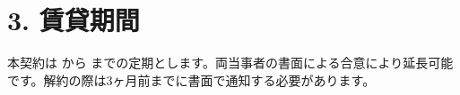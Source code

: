 \section*{3. 賃貸期間}
本契約は \Rentstartdate から \Rentenddate までの定期とします。両当事者の書面による合意により延長可能です。解約の際は3ヶ月前までに書面で通知する必要があります。

